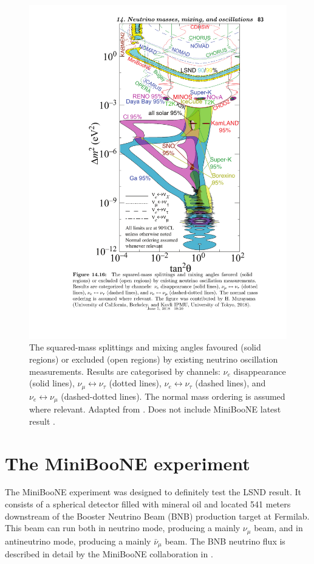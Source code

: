 \begin{figure}[htbp]
    \centering
    \includegraphics[width=0.7\linewidth]{figures/globalfit.pdf}
    \caption{The squared-mass splittings and mixing angles favoured (solid regions) or excluded (open regions) by existing neutrino oscillation measurements. Results are categorised by channels: $\nu_e$ disappearance (solid lines), $\nu_{\mu} \leftrightarrow \nu_{\tau}$  (dotted lines), $\nu_{e} \leftrightarrow \nu_{\tau}$ (dashed lines), and $\nu_{e} \leftrightarrow \nu_{\mu}$ (dashed-dotted lines). The normal mass ordering is assumed where relevant. Adapted from \cite{PhysRevD.98.030001}. Does not include MiniBooNE latest result \cite{Aguilar-Arevalo:2018gpe}.}
    \label{fig:globalfit}
\end{figure}

\section{The MiniBooNE experiment}\label{sec:miniboone}
The MiniBooNE experiment was designed to definitely test the LSND result. It consists of a spherical detector filled with mineral oil and located 541 meters downstream of the Booster Neutrino Beam (BNB) production target at Fermilab. This beam can run both in neutrino mode, producing a mainly $\nu_{\mu}$ beam, and in antineutrino mode, producing a mainly $\bar{\nu}_{\mu}$ beam. The BNB neutrino flux is described in detail by the MiniBooNE collaboration in \cite{AguilarArevalo:2008yp}.

